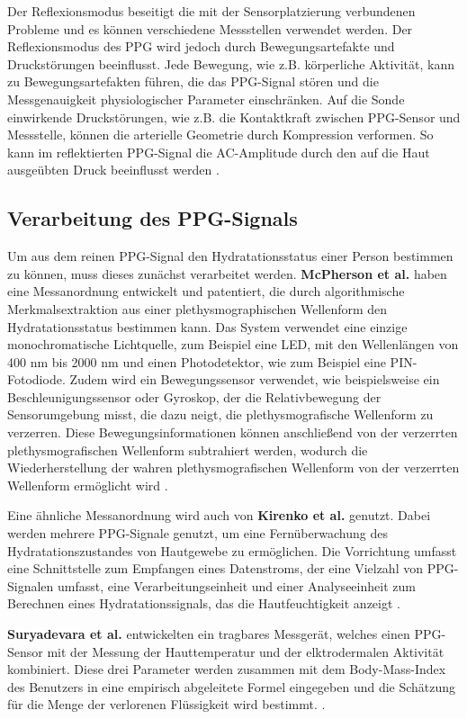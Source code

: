 \documentclass[10pt,a4paper,headinclude,twoside, plainheadsepline, open=right, numbers=noenddot, twocolumn]{article}
\begin{document}
Der Reflexionsmodus beseitigt die mit der Sensorplatzierung verbundenen Probleme und es können verschiedene Messstellen verwendet werden.
Der Reflexionsmodus des PPG wird jedoch durch Bewegungsartefakte und Druckstörungen beeinflusst.
Jede Bewegung, wie z.B. körperliche Aktivität, kann zu Bewegungsartefakten führen, die das PPG-Signal stören und die Messgenauigkeit physiologischer Parameter einschränken.
Auf die Sonde einwirkende Druckstörungen, wie z.B. die Kontaktkraft zwischen PPG-Sensor und Messstelle, können die arterielle Geometrie durch Kompression verformen.
So kann im reflektierten PPG-Signal die AC-Amplitude durch den auf die Haut ausgeübten Druck beeinflusst werden \cite{tamura2014wearable}.

\subsection{Verarbeitung des PPG-Signals}
\label{verarbeitung des ppg-signals}

Um aus dem reinen PPG-Signal den Hydratationsstatus einer Person bestimmen zu können, muss dieses zunächst verarbeitet werden.
\textbf{McPherson et al.} haben eine Messanordnung entwickelt und patentiert, die durch algorithmische Merkmalsextraktion aus einer plethysmographischen Wellenform den Hydratationsstatus bestimmen kann. 
Das System verwendet eine einzige monochromatische Lichtquelle, zum Beispiel eine LED, mit den Wellenlängen von 400 nm bis 2000 nm und einen Photodetektor, wie zum Beispiel eine PIN-Fotodiode.
Zudem wird ein Bewegungssensor verwendet, wie beispielsweise ein Beschleunigungssensor oder Gyroskop, der die Relativbewegung der Sensorumgebung misst, die dazu neigt, die plethysmografische Wellenform zu verzerren. 
Diese Bewegungsinformationen können anschließend von der verzerrten plethysmografischen Wellenform subtrahiert werden, wodurch die Wiederherstellung der wahren plethysmografischen Wellenform von der verzerrten Wellenform ermöglicht wird \cite{mcpherson2015systems}.

Eine ähnliche Messanordnung wird auch von \textbf{Kirenko et al.} genutzt.
Dabei werden mehrere PPG-Signale genutzt, um eine Fernüberwachung des Hydratationszustandes von Hautgewebe zu ermöglichen.
Die Vorrichtung umfasst eine Schnittstelle zum Empfangen eines Datenstroms, der eine Vielzahl von PPG-Signalen umfasst, eine Verarbeitungseinheit und
einer Analyseeinheit zum Berechnen eines Hydratationssignals, das die Hautfeuchtigkeit anzeigt \cite{kirenko2017unobtrusive}.

\textbf{Suryadevara et al.} entwickelten ein tragbares Messgerät, welches einen PPG-Sensor mit der Messung der Hauttemperatur und der elktrodermalen Aktivität kombiniert.
Diese drei Parameter werden zusammen mit dem Body-Mass-Index des Benutzers in eine empirisch abgeleitete Formel eingegeben und die Schätzung für die Menge der verlorenen Flüssigkeit wird bestimmt. \cite{suryadevara2015towards}.
\end{document}
